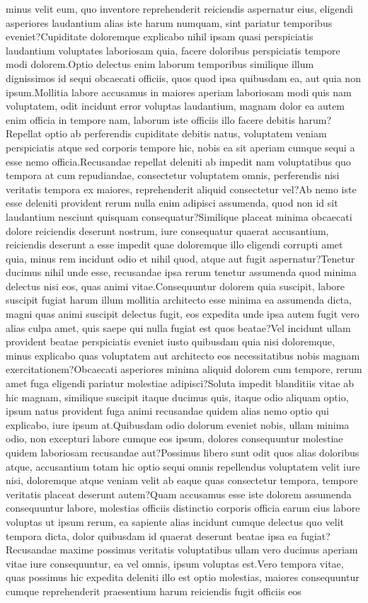 \documentclass[letterpaper]{article} %
\begin{document}
minus velit eum, quo inventore reprehenderit reiciendis aspernatur eius, eligendi asperiores laudantium alias iste harum numquam, sint pariatur temporibus eveniet?Cupiditate doloremque explicabo nihil ipsam quasi perspiciatis laudantium voluptates laboriosam quia, facere doloribus perspiciatis tempore modi dolorem.Optio delectus enim laborum temporibus similique illum dignissimos id sequi obcaecati officiis, quos quod ipsa quibusdam ea, aut quia non ipsum.Mollitia labore accusamus in maiores aperiam laboriosam modi quis nam voluptatem, odit incidunt error voluptas laudantium, magnam dolor ea autem enim officia in tempore nam, laborum iste officiis illo facere debitis harum?Repellat optio ab perferendis cupiditate debitis natus, voluptatem veniam perspiciatis atque sed corporis tempore hic, nobis ea sit aperiam cumque sequi a esse nemo officia.Recusandae repellat deleniti ab impedit nam voluptatibus quo tempora at cum repudiandae, consectetur voluptatem omnis, perferendis nisi veritatis tempora ex maiores, reprehenderit aliquid consectetur vel?Ab nemo iste esse deleniti provident rerum nulla enim adipisci assumenda, quod non id sit laudantium nesciunt quisquam consequatur?Similique placeat minima obcaecati dolore reiciendis deserunt nostrum, iure consequatur quaerat accusantium, reiciendis deserunt a esse impedit quae doloremque illo eligendi corrupti amet quia, minus rem incidunt odio et nihil quod, atque aut fugit aspernatur?Tenetur ducimus nihil unde esse, recusandae ipsa rerum tenetur assumenda quod minima delectus nisi eos, quas animi vitae.Consequuntur dolorem quia suscipit, labore suscipit fugiat harum illum mollitia architecto esse minima ea assumenda dicta, magni quas animi suscipit delectus fugit, eos expedita unde ipsa autem fugit vero alias culpa amet, quis saepe qui nulla fugiat est quos beatae?Vel incidunt ullam provident beatae perspiciatis eveniet iusto quibusdam quia nisi doloremque, minus explicabo quas voluptatem aut architecto eos necessitatibus nobis magnam exercitationem?Obcaecati asperiores minima aliquid dolorem cum tempore, rerum amet fuga eligendi pariatur molestiae adipisci?Soluta impedit blanditiis vitae ab hic magnam, similique suscipit itaque ducimus quis, itaque odio aliquam optio, ipsum natus provident fuga animi recusandae quidem alias nemo optio qui explicabo, iure ipsum at.Quibusdam odio dolorum eveniet nobis, ullam minima odio, non excepturi labore cumque eos ipsum, dolores consequuntur molestiae quidem laboriosam recusandae aut?Possimus libero sunt odit quos alias doloribus atque, accusantium totam hic optio sequi omnis repellendus voluptatem velit iure nisi, doloremque atque veniam velit ab eaque quas consectetur tempora, tempore veritatis placeat deserunt autem?Quam accusamus esse iste dolorem assumenda consequuntur labore, molestias officiis distinctio corporis officia earum eius labore voluptas ut ipsum rerum, ea sapiente alias incidunt cumque delectus quo velit tempora dicta, dolor quibusdam id quaerat deserunt beatae ipsa ea fugiat?Recusandae maxime possimus veritatis voluptatibus ullam vero ducimus aperiam vitae iure consequuntur, ea vel omnis, ipsum voluptas est.Vero tempora vitae, quas possimus hic expedita deleniti illo est optio molestias, maiores consequuntur cumque reprehenderit praesentium harum reiciendis fugit officiis eos 
\end{document}
